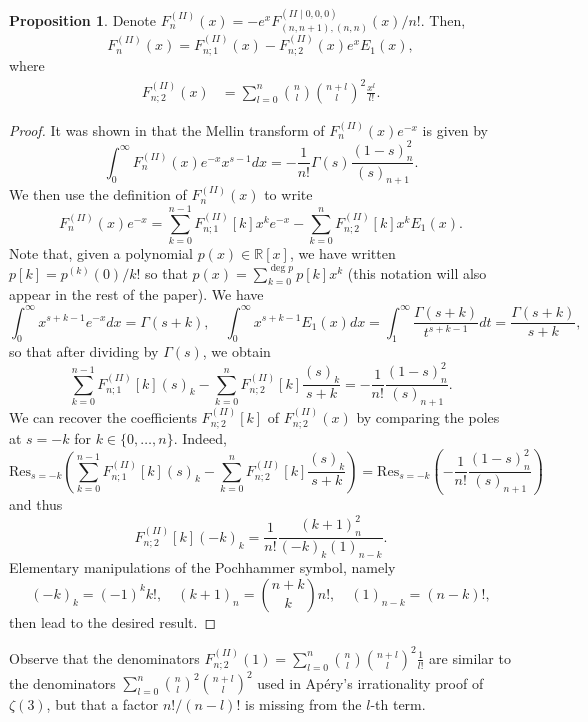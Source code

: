 \documentclass[a4paper,12pt,oneside]{article}
\theoremstyle{definition}
\newtheorem{prop}[defi]{Proposition}
\newcommand{\R}{\mathbb{R}}
\begin{document}
\begin{prop} \label{II_form}
Denote $F_{n}^{(II)}(x) = - e^{x} F_{(n,n+1),(n,n)}^{(II\mid 0,0,0)}(x)/n!$. Then,
    $$F_{n}^{(II)}(x) = F_{n;1}^{(II)}(x) - F_{n;2}^{(II)}(x) e^{x} E_{1}(x),$$
where
$$\begin{aligned}
    F_{n;2}^{(II)}(x) &= \sum_{l=0}^{n} \binom{n}{l} \binom{n+l}{l}^2 \frac{x^l}{l!}.
\end{aligned}$$
\end{prop}
\begin{proof}
It was shown in \cite[Lemma 4.1]{VAWolfs} that the Mellin transform of $F_{n}^{(II)}(x) e^{-x}$ is given by
    $$ \int_0^\infty F_{n}^{(II)}(x) e^{-x} x^{s-1} dx  = - \frac{1}{n!} \Gamma(s) \frac{(1-s)_n^2}{(s)_{n+1}} . $$
We then use the definition of $F_{n}^{(II)}(x)$ to write
$$F_{n}^{(II)}(x) e^{-x} = \sum_{k=0}^{n-1} F_{n;1}^{(II)}[k] x^k e^{-x} -  \sum_{k=0}^{n} F_{n;2}^{(II)}[k] x^k E_1(x).$$ 
Note that, given a polynomial $p(x)\in\R[x]$, we have written $p[k]=p^{(k)}(0)/k!$ so that $p(x) = \sum_{k=0}^{\deg p} p[k] x^k$ (this notation will also appear in the rest of the paper). We have
    $$ \int_0^\infty x^{s+k-1} e^{-x} dx = \Gamma(s+k),\quad \int_0^\infty x^{s+k-1} E_1(x) dx = \int_1^\infty \frac{\Gamma(s+k)}{t^{s+k-1}} dt =   \frac{\Gamma(s+k)}{s+k}, $$
so that after dividing by $\Gamma(s)$, we obtain
\begin{equation} \label{II_MT}
    \sum_{k=0}^{n-1} F_{n;1}^{(II)}[k] (s)_k -  \sum_{k=0}^{n} F_{n;2}^{(II)}[k] \frac{(s)_k}{s+k} = - \frac{1}{n!} \frac{(1-s)_n^2}{(s)_{n+1}}.
\end{equation}
We can recover the coefficients $F_{n;2}^{(II)}[k]$ of $F_{n;2}^{(II)}(x)$ by comparing the poles at $s=-k$ for $k\in\{0,\dots,n\}$. Indeed,
    $$ \text{Res}_{s=-k}\left(\sum_{k=0}^{n-1} F_{n;1}^{(II)}[k] (s)_k -  \sum_{k=0}^{n} F_{n;2}^{(II)}[k] \frac{(s)_k}{s+k} \right) = \text{Res}_{s=-k}\left( - \frac{1}{n!} \frac{(1-s)_n^2}{(s)_{n+1}} \right) $$
and thus
$$ F_{n;2}^{(II)}[k] (-k)_k = \frac{1}{n!} \frac{(k+1)_n^2}{(-k)_{k}(1)_{n-k}}. $$
Elementary manipulations of the Pochhammer symbol, namely
    $$ (-k)_k = (-1)^k k!,\quad (k+1)_n = \binom{n+k}{k} n!,\quad (1)_{n-k}=(n-k)!, $$
then lead to the desired result.
\end{proof}

Observe that the denominators $F_{n;2}^{(II)}(1)=\sum_{l=0}^{n} \binom{n}{l} \binom{n+l}{l}^2 \frac{1}{l!}$ are similar to the denominators $\sum_{l=0}^{n} \binom{n}{l}^2 \binom{n+l}{l}^2$ used in Apéry's irrationality proof \cite{Apery} of $\zeta(3)$, but that a factor $n!/(n-l)!$ is missing from the $l$-th term.
\medbreak
\end{document}
